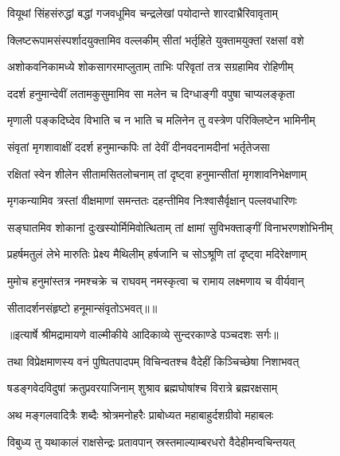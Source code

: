 \twolineshloka
{वियूथां सिंहसंरुद्धां बद्धां गजवधूमिव}
{चन्द्रलेखां पयोदान्ते शारदाभ्रैरिवावृताम्} %

\twolineshloka
{क्लिष्टरूपामसंस्पर्शादयुक्तामिव वल्लकीम्}
{सीतां भर्तृहिते युक्तामयुक्तां रक्षसां वशे} %

\twolineshloka
{अशोकवनिकामध्ये शोकसागरमाप्लुताम्}
{ताभिः परिवृतां तत्र सग्रहामिव रोहिणीम्} %

\twolineshloka
{ददर्श हनुमान्देवीं लतामकुसुमामिव}
{सा मलेन च दिग्धाङ्गी वपुषा चाप्यलङ्कृता} %

\twolineshloka
{मृणाली पङ्कदिघ्देव विभाति च न भाति च}
{मलिनेन तु वस्त्रेण परिक्लिष्टेन भामिनीम्} %

\twolineshloka
{संवृतां मृगशावाक्षीं ददर्श हनुमान्कपिः}
{तां देवीं दीनवदनामदीनां भर्तृतेजसा} %

\twolineshloka
{रक्षितां स्वेन शीलेन सीतामसितलोचनाम्}
{तां दृष्ट्वा हनुमान्सीतां मृगशावनिभेक्षणाम्} %

\twolineshloka
{मृगकन्यामिव त्रस्तां वीक्षमाणां समन्ततः}
{दहन्तीमिव निःश्वासैर्वृक्षान् पल्लवधारिणः} %

\twolineshloka
{सङ्घातमिव शोकानां दुःखस्योर्मिमिवोत्थिताम्}
{तां क्षामां सुविभक्ताङ्गीं विनाभरणशोभिनीम्} %

\twolineshloka
{प्रहर्षमतुलं लेभे मारुतिः प्रेक्ष्य मैथिलीम्}
{हर्षजानि च सोऽश्रूणि तां दृष्ट्वा मदिरेक्षणाम्} %

\twolineshloka
{मुमोच हनुमांस्तत्र नमश्चक्रे च राघवम्}
{नमस्कृत्वा च रामाय लक्ष्मणाय च वीर्यवान्} %

{सीतादर्शनसंहृष्टो हनूमान्संवृतोऽभवत्॥॥} %

\addtocounter{shlokacount}{1}


{॥इत्यार्षे श्रीमद्रामायणे वाल्मीकीये आदिकाव्ये सुन्दरकाण्डे पञ्चदशः सर्गः॥}


\twolineshloka
{तथा विप्रेक्षमाणस्य वनं पुष्पितपादपम्}
{विचिन्वतश्च वैदेहीं किञ्चिच्छेषा निशाभवत्} %

\twolineshloka
{षडङ्गवेदविदुषां क्रतुप्रवरयाजिनाम्}
{शुश्राव ब्रह्मघोषांश्च विरात्रे ब्रह्मरक्षसाम्} %

\twolineshloka
{अथ मङ्गलवादित्रैः शब्दैः श्रोत्रमनोहरैः}
{प्राबोध्यत महाबाहुर्दशग्रीवो महाबलः} %

\twolineshloka
{विबुध्य तु यथाकालं राक्षसेन्द्रः प्रतावपान्}
{स्रस्तमाल्याम्बरधरो वैदेहीमन्वचिन्तयत्} %

